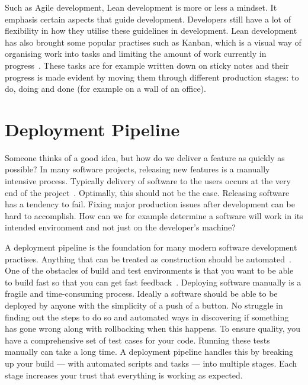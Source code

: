 \documentclass[english]{tktltiki2}
\begin{document}
Such as Agile development, Lean development is more or less a mindset. It emphasis certain aspects that guide development. Developers still have a lot of flexibility in how they utilise these guidelines in development. Lean development has also brought some popular practises such as Kanban, which is a visual way of organising work into tasks and limiting the amount of work currently in progress~\cite{Mon12}. These tasks are for example written down on sticky notes and their progress is made evident by moving them through different production stages: to do, doing and done (for example on a wall of an office).


\section{Deployment Pipeline}

Someone thinks of a good idea, but how do we deliver a feature as quickly as possible? In many software projects, releasing new features is a manually intensive process. Typically delivery of software to the users occurs at the very end of the project~\cite{HAB12}. Optimally, this should not be the case. Releasing software has a tendency to fail. Fixing major production issues after development can be hard to accomplish. How can we for example determine a software will work in its intended environment and not just on the developer’s machine?

A deployment pipeline is the foundation for many modern software development practises. Anything that can be treated as construction should be automated~\cite{Fow05}. One of the obstacles of build and test environments is that you want to be able to build fast so that you can get fast feedback~\cite{Fow13b}. Deploying software manually is a fragile and time-consuming process. Ideally a software should be able to be deployed by anyone with the simplicity of a push of a button. No struggle in finding out the steps to do so and automated ways in discovering if something has gone wrong along with rollbacking when this happens. To ensure quality, you have a comprehensive set of test cases for your code. Running these tests manually can take a long time. A deployment pipeline handles this by breaking up your build — with automated scripts and tasks — into multiple stages. Each stage increases your trust that everything is working as expected.
\end{document}
